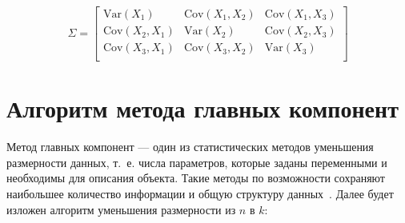 \begin{equation}\label{eq:covariance_matrix}
	\Sigma = 
	\begin{bmatrix}
		\text{Var}(X_1) & \text{Cov}(X_1, X_2) & \text{Cov}(X_1, X_3) \\
		\text{Cov}(X_2, X_1) & \text{Var}(X_2) & \text{Cov}(X_2, X_3) \\
		\text{Cov}(X_3, X_1) & \text{Cov}(X_3, X_2) & \text{Var}(X_3) \\
	\end{bmatrix}
\end{equation}

\section{Алгоритм метода главных компонент}

Метод главных компонент --- один из статистических методов уменьшения размерности данных, т.~е. числа параметров, которые заданы переменными и необходимы для описания объекта. Такие методы по возможности сохраняют наибольшее количество информации и общую структуру данных~\cite{orlov, polyak}. Далее будет изложен алгоритм уменьшения размерности из $n$ в $k$:

